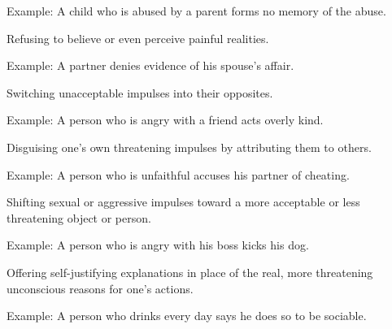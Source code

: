 \begin{coloredlist}
\begin{coloredlist}
\begin{coloredlist}
                \item Example: A child who is abused by a parent forms no memory of the abuse.
            \end{coloredlist}
            \item {}
            \begin{coloredlist}
                \item Refusing to believe or even perceive painful realities.
                \item Example: A partner denies evidence of his spouse's affair.
            \end{coloredlist}
            \item {}
            \begin{coloredlist}
                \item Switching unacceptable impulses into their opposites.
                \item Example: A person who is angry with a friend acts overly kind.
            \end{coloredlist}
            \item {}
            \begin{coloredlist}
                \item Disguising one's own threatening impulses by attributing them to others.
                \item Example: A person who is unfaithful accuses his partner of cheating.
            \end{coloredlist}
            \item {}
            \begin{coloredlist}
                \item Shifting sexual or aggressive impulses toward a more acceptable or less threatening object or person.
                \item Example: A person who is angry with his boss kicks his dog.
            \end{coloredlist}
            \item {}
            \begin{coloredlist}
                \item Offering self-justifying explanations in place of the real, more threatening unconscious reasons for one's actions.
                \item Example: A person who drinks every day says he does so to be sociable.
            \end{coloredlist}

\end{coloredlist}
\end{coloredlist}
